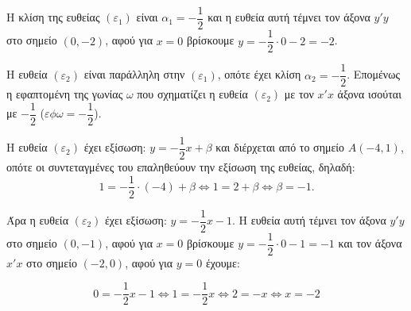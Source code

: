 
\begin{alist}
\item Η κλίση της ευθείας $(\varepsilon_1)$ είναι $\alpha_1 = -\dfrac{1}{2}$ και η ευθεία αυτή τέμνει τον άξονα $y'y$ στο σημείο $(0, -2)$, αφού  για $x = 0$ βρίσκουμε $y = -\dfrac{1}{2}\cdot 0 - 2 = -2$.

\item Η ευθεία $(\varepsilon_2)$ είναι παράλληλη στην $(\varepsilon_1)$, οπότε έχει κλίση $\alpha_2 = -\dfrac{1}{2}$. Επομένως η εφαπτομένη της γωνίας $\omega$ που σχηματίζει η ευθεία $(\varepsilon_2)$ με τον $x'x$ άξονα ισούται με $-\dfrac{1}{2}$ ($\varepsilon\phi\omega = -\dfrac{1}{2}$).

\item Η ευθεία $(\varepsilon_2)$ έχει εξίσωση: $y = -\dfrac{1}{2}x + \beta$ και διέρχεται από το σημείο $A(-4, 1)$, οπότε οι συντεταγμένες του επαληθεύουν την εξίσωση της ευθείας, δηλαδή:
\[1 = -\dfrac{1}{2}\cdot (-4) + \beta \Leftrightarrow 1 = 2 + \beta \Leftrightarrow \beta = -1.\]

Άρα η ευθεία $(\varepsilon_2)$ έχει εξίσωση: $y = -\dfrac{1}{2}x - 1$.
Η ευθεία αυτή τέμνει τον άξονα $y'y$ στο σημείο $(0, -1)$, αφού για $x = 0$ βρίσκουμε
$y = -\dfrac{1}{2}\cdot 0 - 1 = -1$ και τον άξονα $x'x$ στο σημείο $(-2, 0)$, αφού για $y = 0$ έχουμε:

\[0 = -\dfrac{1}{2}x - 1 \Leftrightarrow 1 = -\dfrac{1}{2}x \Leftrightarrow 2 = -x \Leftrightarrow x = -2\]
\end{alist}

